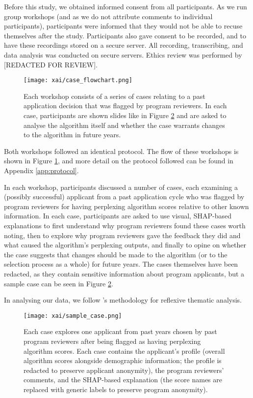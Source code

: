 Before this study, we obtained informed consent from all participants. As we run group workshops (and as we do not attribute comments to individual participants), participants were informed that they would not be able to recuse themselves after the study. Participants also gave consent to be recorded, and to have these recordings stored on a secure server. All recording, transcribing, and data analysis was conducted on secure servers. Ethics review was performed by [REDACTED FOR REVIEW].

\begin{figure}[htbp]
    \centering
    \texttt{[image: xai/case\_flowchart.png]}
    \caption{Each workshop consists of a series of cases relating to a past application decision that was flagged by program reviewers. In each case, participants are shown slides like in Figure \ref{fig:sample_case} and are asked to analyse the algorithm itself and whether the case warrants changes to the algorithm in future years.}
    \label{fig:case_flowchart}
\end{figure}

Both workshops followed an identical protocol. The flow of these workshops is shown in Figure \ref{fig:case_flowchart}, and more detail on the protocol followed can be found in Appendix \ref{app:protocol}.

In each workshop, participants discussed a number of cases, each examining a (possibly successful) applicant from a past application cycle who was flagged by program reviewers for having perplexing algorithm scores relative to other known information. In each case, participants are asked to use visual, SHAP-based explanations to first understand why program reviewers found these cases worth noting, then to explore why program reviewers gave the feedback they did and what caused the algorithm's perplexing outputs, and finally to opine on whether the case suggests that changes should be made to the algorithm (or to the selection process as a whole) for future years. The cases themselves have been redacted, as they contain sensitive information about program applicants, but a sample case can be seen in Figure \ref{fig:sample_case}.

In analysing our data, we follow \textcite{braun_using_2006}'s methodology for reflexive thematic analysis. 

\begin{figure}[htbp]
    \centering
    \texttt{[image: xai/sample\_case.png]}
    \caption{Each case explores one applicant from past years chosen by past program reviewers after being flagged as having perplexing algorithm scores. Each case contains the applicant's profile (overall algorithm scores alongside demographic information; the profile is redacted to preserve applicant anonymity), the program reviewers' comments, and the SHAP-based explanation (the score names are replaced with generic labels to preserve program anonymity).}
    \label{fig:sample_case}
    
\end{figure}

